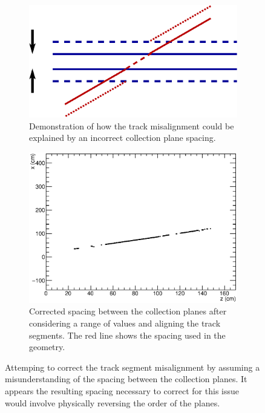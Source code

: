 \begin{figure}
  \centering
  \begin{subfigure}[t]{0.48\linewidth}
    \centering
    \includegraphics[width=\textwidth]{misalign_track_collection_geo.eps}
    \caption{Demonstration of how the track misalignment could be explained by an incorrect collection plane spacing.}
    \label{fig:TrackMisalignmentCollectionSpacingGeo}
  \end{subfigure}
  \hfill
  \begin{subfigure}[t]{0.48\linewidth}
    \centering
    \includegraphics[width=\textwidth]{misalign_track_collection_res.eps}
    \caption{Corrected spacing between the collection planes after considering a range of values and aligning the track segments.  The red line shows the spacing used in the geometry.}
    \label{fig:TrackMisalignmentCollectionSpacingRes}
  \end{subfigure}
  \caption[Attemping to correct the track segment misalignment by assuming a misunderstanding of the spacing between the collection planes.]{Attemping to correct the track segment misalignment by assuming a misunderstanding of the spacing between the collection planes.  It appears the resulting spacing necessary to correct for this issue would involve physically reversing the order of the planes.}
  \label{fig:TrackMisalignmentCollectionSpacing}
\end{figure}

